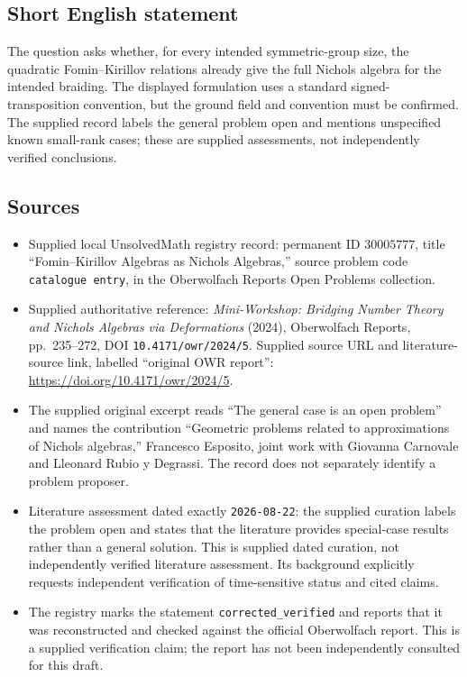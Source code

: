 \documentclass[11pt]{article}
\begin{document}
\subsection{Short English statement}
The question asks whether, for every intended symmetric-group size, the quadratic Fomin--Kirillov relations already give the full Nichols algebra for the intended braiding. The displayed formulation uses a standard signed-transposition convention, but the ground field and convention must be confirmed. The supplied record labels the general problem open and mentions unspecified known small-rank cases; these are supplied assessments, not independently verified conclusions.
\subsection{Sources}
\begin{itemize}
\item Supplied local UnsolvedMath registry record: permanent ID \(30005777\), title ``Fomin--Kirillov Algebras as Nichols Algebras,'' source problem code \texttt{catalogue entry}, in the Oberwolfach Reports Open Problems collection.
\item Supplied authoritative reference: \emph{Mini-Workshop: Bridging Number Theory and Nichols Algebras via Deformations} (2024), Oberwolfach Reports, pp.\ 235--272, DOI \texttt{10.4171/owr/2024/5}. Supplied source URL and literature-source link, labelled ``original OWR report'': \url{https://doi.org/10.4171/owr/2024/5}.
\item The supplied original excerpt reads ``The general case is an open problem'' and names the contribution ``Geometric problems related to approximations of Nichols algebras,'' Francesco Esposito, joint work with Giovanna Carnovale and Lleonard Rubio y Degrassi. The record does not separately identify a problem proposer.
\item Literature assessment dated exactly \texttt{2026-08-22}: the supplied curation labels the problem open and states that the literature provides special-case results rather than a general solution. This is supplied dated curation, not independently verified literature assessment. Its background explicitly requests independent verification of time-sensitive status and cited claims.
\item The registry marks the statement \texttt{corrected\_verified} and reports that it was reconstructed and checked against the official Oberwolfach report. This is a supplied verification claim; the report has not been independently consulted for this draft.
\end{itemize}
\end{document}
